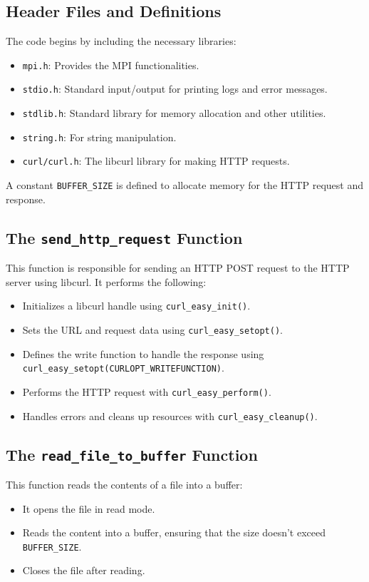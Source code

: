 \documentclass[a4paper,12pt]{article}
\begin{document}
\subsection{Header Files and Definitions}
The code begins by including the necessary libraries:
\begin{itemize}
    \item \texttt{mpi.h}: Provides the MPI functionalities.
    \item \texttt{stdio.h}: Standard input/output for printing logs and error messages.
    \item \texttt{stdlib.h}: Standard library for memory allocation and other utilities.
    \item \texttt{string.h}: For string manipulation.
    \item \texttt{curl/curl.h}: The libcurl library for making HTTP requests.
\end{itemize}

A constant \texttt{BUFFER\_SIZE} is defined to allocate memory for the HTTP request and response.

\subsection{The \texttt{send\_http\_request} Function}
This function is responsible for sending an HTTP POST request to the HTTP server using libcurl. It performs the following:
\begin{itemize}
    \item Initializes a libcurl handle using \texttt{curl\_easy\_init()}.
    \item Sets the URL and request data using \texttt{curl\_easy\_setopt()}.
    \item Defines the write function to handle the response using \texttt{curl\_easy\_setopt(CURLOPT\_WRITEFUNCTION)}.
    \item Performs the HTTP request with \texttt{curl\_easy\_perform()}.
    \item Handles errors and cleans up resources with \texttt{curl\_easy\_cleanup()}.
\end{itemize}

\subsection{The \texttt{read\_file\_to\_buffer} Function}
This function reads the contents of a file into a buffer:
\begin{itemize}
    \item It opens the file in read mode.
    \item Reads the content into a buffer, ensuring that the size doesn't exceed \texttt{BUFFER\_SIZE}.
    \item Closes the file after reading.
\end{itemize}
\end{document}
